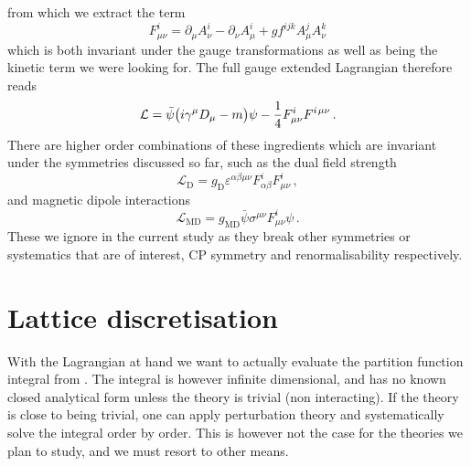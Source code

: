%
from which we extract the term
%
\begin{equation} \label{eq:field_strength}
  F_{\mu\nu}^i = \partial_{\mu} A^i_{\nu} - \partial_{\nu}
    A^i_{\mu} + g f^{ijk} A^j_{\mu} A^k_{\nu}
\end{equation}
%
which is both invariant under the gauge transformations as well as being the
kinetic term we were looking for. The full gauge extended Lagrangian therefore
reads
%
\begin{equation} \label{eq:gauge_lagrangian}
  \mathcal{L} = \bar{\psi}\big(i \gamma^{\mu} D_{\mu} - m\big)\psi 
    - \frac{1}{4} F^i_{\mu\nu} F^{i\hskip.2ex\mu\nu} \,.
\end{equation}
%
There are higher order combinations of these ingredients which are invariant
under the symmetries discussed so far, such as the dual field strength
%
\begin{equation}
  \mathcal{L}_{\mathrm{D}} = g_{\mathrm{D}} \varepsilon^{\alpha\beta\mu\nu}
    F^i_{\alpha\beta} F^i_{\mu\nu}\,,
\end{equation}
%
and magnetic dipole interactions
%
\begin{equation}
  \mathcal{L}_{\mathrm{MD}} = g_{\mathrm{MD}} \bar{\psi} \sigma^{\mu\nu} F^i_{\mu\nu} \psi\,.
\end{equation}
%
These we ignore in the current study as they break other symmetries or
systematics that are of interest, CP symmetry and renormalisability
respectively.

\section{Lattice discretisation} \label{sec:lattice_intro}

With the Lagrangian at hand we want to actually evaluate the partition function
integral from . The integral is however infinite
dimensional, and has no known closed analytical form unless the theory is
trivial (non interacting). If the theory is close to being trivial, one can
apply perturbation theory and systematically solve the integral order by order.
This is however not the case for the theories we plan to study, and we must
resort to other means.

